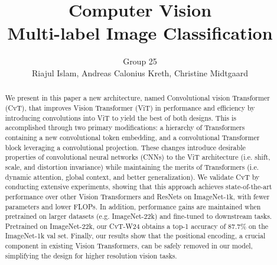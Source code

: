 \documentclass[lettersize,journal]{IEEEtran}
\begin{document}
\title{Computer Vision\\ \vspace{.5em} 
\Large Multi-label Image Classification}
\author{Group 25 \\ \vspace{.2em} Riajul Islam, Andreas Calonius Kreth, Christine Midtgaard}



\maketitle







\begin{abstract}
    We present in this paper a new architecture, named Convolutional vision Transformer (CvT), that improves Vision
    Transformer (ViT) in performance and efficiency by introducing convolutions into ViT to yield the best of both designs. This is accomplished through two primary modifications: a hierarchy of Transformers containing a new convolutional token embedding, and a convolutional Transformer
    block leveraging a convolutional projection. These changes
    introduce desirable properties of convolutional neural networks (CNNs) to the ViT architecture (i.e. shift, scale,
    and distortion invariance) while maintaining the merits of
    Transformers (i.e. dynamic attention, global context, and
    better generalization). We validate CvT by conducting extensive experiments, showing that this approach achieves
    state-of-the-art performance over other Vision Transformers and ResNets on ImageNet-1k, with fewer parameters and lower FLOPs. In addition, performance gains
    are maintained when pretrained on larger datasets (e.g.
    ImageNet-22k) and fine-tuned to downstream tasks. Pretrained on ImageNet-22k, our CvT-W24 obtains a top-1 accuracy of 87.7\% on the ImageNet-1k val set. Finally, our
    results show that the positional encoding, a crucial component in existing Vision Transformers, can be safely removed in our model, simplifying the design for higher resolution vision tasks.
\end{abstract}
\end{document}
